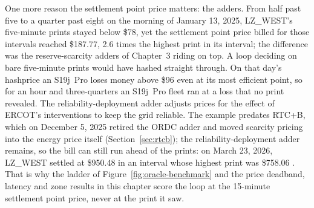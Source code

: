 One more reason the settlement point price matters: the adders. From half past five to a quarter past eight on the morning of January 13, 2025, LZ\_WEST's five-minute prints stayed below \$78, yet the settlement point price billed for those intervals reached \$187.77, 2.6 times the highest print in its interval; the difference was the reserve-scarcity adders of Chapter~3 riding on top. %
A loop deciding on bare five-minute prints would have hashed straight through. On that day's hashprice an S19j~Pro loses money above \$96 even at its most efficient point, so for an hour and three-quarters an S19j~Pro fleet ran at a loss that no print revealed. %
The reliability-deployment adder adjusts prices for the effect of ERCOT's interventions to keep the grid reliable. The example predates RTC+B, which on December 5, 2025 retired the ORDC adder and moved scarcity pricing into the energy price itself (Section~\ref{sec:rtcb}); the reliability-deployment adder remains, so the bill can still run ahead of the prints: on March 23, 2026, LZ\_WEST settled at \$950.48 in an interval whose highest print was \$758.06 \autocite{ercot2025rtcblive,potomac2026somercot,ercot2026protocols}. %
That is why the ladder of Figure~\ref{fig:oracle-benchmark} and the price deadband, latency and zone results in this chapter score the loop at the 15-minute settlement point price, never at the print it saw.

